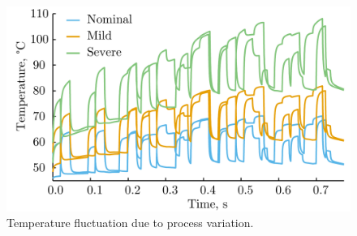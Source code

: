 \begin{figure}[bl]
  \vspace{-1.5em}
  \centering
  \includegraphics[width=0.8\linewidth]{include/assets/motivation-curve.pdf}
  \caption{Temperature fluctuation due to process variation.}
  \vspace{-1.0em}
\end{figure}
